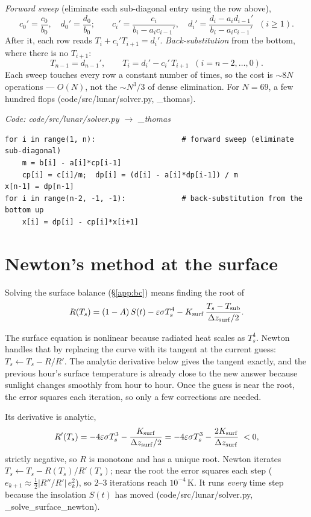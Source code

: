 \documentclass[11pt]{report}
\newcommand{\code}[1]{{\ttfamily\small #1}}
\begin{document}
\emph{Forward sweep} (eliminate each sub-diagonal entry using the row above),
\[
c_0'=\frac{c_0}{b_0},\quad d_0'=\frac{d_0}{b_0};\qquad
c_i'=\frac{c_i}{b_i-a_i c_{i-1}'},\quad
d_i'=\frac{d_i-a_i d_{i-1}'}{b_i-a_i c_{i-1}'}\;\;(i\ge1).
\]
After it, each row reads $T_i+c_i' T_{i+1}=d_i'$. \emph{Back-substitution} from
the bottom, where there is no $T_{i+1}$:
\[
T_{n-1}=d_{n-1}',\qquad T_i=d_i'-c_i'\,T_{i+1}\;\;(i=n{-}2,\dots,0).
\]
Each sweep touches every row a constant number of times, so the cost is
$\sim$$8N$ operations --- $O(N)$, not the $\sim N^3/3$ of dense elimination. For
$N=69$, a few hundred flops (\code{code/src/lunar/solver.py}, \code{\_thomas}).

{\small\color{dim}\textit{Code: \code{code/src/lunar/solver.py} $\to$ \code{\_thomas}}}
\begin{lstlisting}[style=py]
for i in range(1, n):                    # forward sweep (eliminate sub-diagonal)
    m = b[i] - a[i]*cp[i-1]
    cp[i] = c[i]/m;  dp[i] = (d[i] - a[i]*dp[i-1]) / m
x[n-1] = dp[n-1]
for i in range(n-2, -1, -1):             # back-substitution from the bottom up
    x[i] = dp[i] - cp[i]*x[i+1]
\end{lstlisting}

\section{Newton's method at the surface}\label{app:newton}
Solving the surface balance (\S\ref{app:bc}) means finding the root of
\[
R(T_s)=(1-A)\,S(t)-\varepsilon\sigma T_s^4
-K_{\rm surf}\,\frac{T_s-T_{\rm sub}}{\Delta z_{\rm surf}/2}.
\]

\begin{plain}
The surface equation is nonlinear because radiated heat scales as $T_s^4$. Newton
handles that by replacing the curve with its tangent at the current guess:
$T_s\leftarrow T_s-R/R'$. The analytic derivative below gives the tangent
exactly, and the previous hour's surface temperature is already close to the new
answer because sunlight changes smoothly from hour to hour. Once the guess is
near the root, the error squares each iteration, so only a few corrections are
needed.
\end{plain}

Its derivative is analytic,
\[
R'(T_s)=-4\varepsilon\sigma T_s^3-\frac{K_{\rm surf}}{\Delta z_{\rm surf}/2}
=-4\varepsilon\sigma T_s^3-\frac{2K_{\rm surf}}{\Delta z_{\rm surf}}\;<0,
\]
strictly negative, so $R$ is monotone and has a unique root. Newton iterates
$T_s\leftarrow T_s-R(T_s)/R'(T_s)$; near the root the error squares each step
($e_{k+1}\approx\tfrac12|R''/R'|\,e_k^2$), so $2$--$3$ iterations reach
$10^{-4}$\,K. It runs \emph{every} time step because the insolation $S(t)$ has
moved (\code{code/src/lunar/solver.py}, \code{\_solve\_surface\_newton}).
\end{document}
